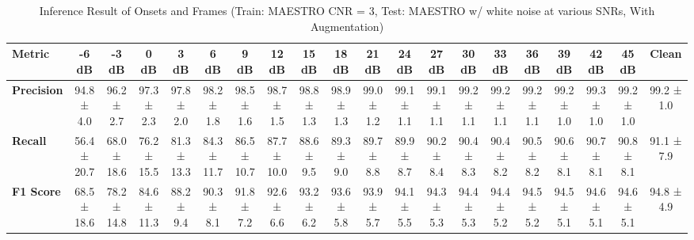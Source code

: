 \documentclass{article}
\begin{document}
\begin{table*}[htbp]
\centering
\caption{Inference Result of Onsets and Frames (Train: MAESTRO CNR = 3, Test: MAESTRO w/ white noise at various SNRs, With Augmentation)}
\begin{adjustbox}{max width=\textwidth}
\begin{tabular}{@{}lccccccccccccccccccc@{}}
\toprule
\textbf{Metric} & \textbf{-6 dB} & \textbf{-3 dB} & \textbf{0 dB} & \textbf{3 dB} & \textbf{6 dB} & \textbf{9 dB} & \textbf{12 dB} & \textbf{15 dB} & \textbf{18 dB} & \textbf{21 dB} & \textbf{24 dB} & \textbf{27 dB} & \textbf{30 dB} & \textbf{33 dB} & \textbf{36 dB} & \textbf{39 dB} & \textbf{42 dB} & \textbf{45 dB} & \textbf{Clean} \\ 
\midrule
\textbf{Precision} & 94.8 ± 4.0 & 96.2 ± 2.7 & 97.3 ± 2.3 & 97.8 ± 2.0 & 98.2 ± 1.8 & 98.5 ± 1.6 & 98.7 ± 1.5 & 98.8 ± 1.3 & 98.9 ± 1.3 & 99.0 ± 1.2 & 99.1 ± 1.1 & 99.1 ± 1.1 & 99.2 ± 1.1 & 99.2 ± 1.1 & 99.2 ± 1.1 & 99.2 ± 1.0 & 99.3 ± 1.0 & 99.2 ± 1.0 & 99.2 ± 1.0 \\
\textbf{Recall}    & 56.4 ± 20.7 & 68.0 ± 18.6 & 76.2 ± 15.5 & 81.3 ± 13.3 & 84.3 ± 11.7 & 86.5 ± 10.7 & 87.7 ± 10.0 & 88.6 ± 9.5 & 89.3 ± 9.0 & 89.7 ± 8.8 & 89.9 ± 8.7 & 90.2 ± 8.4 & 90.4 ± 8.3 & 90.4 ± 8.2 & 90.5 ± 8.2 & 90.6 ± 8.1 & 90.7 ± 8.1 & 90.8 ± 8.1 & 91.1 ± 7.9 \\
\textbf{F1 Score}  & 68.5 ± 18.6 & 78.2 ± 14.8 & 84.6 ± 11.3 & 88.2 ± 9.4 & 90.3 ± 8.1 & 91.8 ± 7.2 & 92.6 ± 6.6 & 93.2 ± 6.2 & 93.6 ± 5.8 & 93.9 ± 5.7 & 94.1 ± 5.5 & 94.3 ± 5.3 & 94.4 ± 5.3 & 94.4 ± 5.2 & 94.5 ± 5.2 & 94.5 ± 5.1 & 94.6 ± 5.1 & 94.6 ± 5.1 & 94.8 ± 4.9 \\
\bottomrule
\end{tabular}
\end{adjustbox}
\end{table*}
\end{document}
